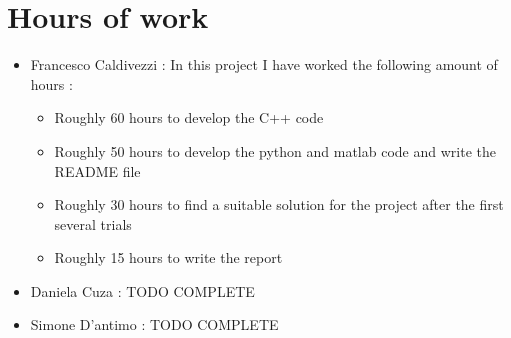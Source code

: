 \section{Hours of work}
    \begin{itemize}
        \item Francesco Caldivezzi : In this project I have worked the following amount of hours : 
        \begin{itemize}
            \item Roughly 60 hours to develop the C++ code
            \item Roughly 50 hours to develop the python and matlab code and write the README file
            \item Roughly 30 hours to find a suitable solution for the project after the first several trials
            \item Roughly 15 hours to write the report
        \end{itemize}
        \item Daniela Cuza : 
            TODO COMPLETE
        \item Simone D'antimo :
            TODO COMPLETE
    \end{itemize}